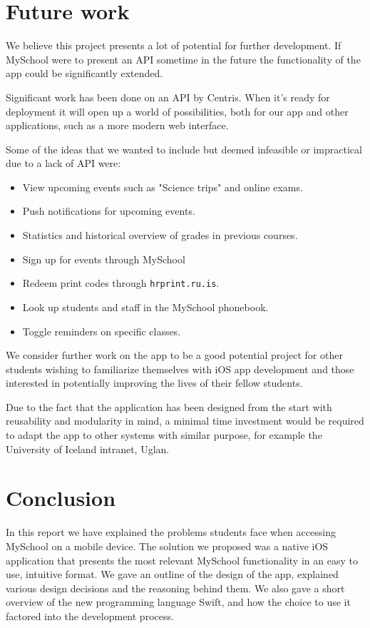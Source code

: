 \documentclass[pdftex, DIV=calc, paper=a4, fontsize=11pt]{scrartcl}	 %
\begin{document}
\section{Future work}
\label{sec:future}

We believe this project presents a lot of potential for further development. If MySchool were to
present an API sometime in the future the functionality of the app could be significantly extended.

Significant work has been done on an API by Centris\cite{centris}. When it's ready for deployment it will open
up a world of possibilities, both for our app and other applications, such as a more modern web 
interface.

Some of the ideas that we wanted to include but deemed infeasible or impractical due to a lack
of API were:

\begin{itemize}
    \item View upcoming events such as "Science trips" and online exams.
    \item Push notifications for upcoming events.
    \item Statistics and historical overview of grades in previous courses.
    \item Sign up for events through MySchool
    \item Redeem print codes through \texttt{hrprint.ru.is}.
    \item Look up students and staff in the MySchool phonebook.
    \item Toggle reminders on specific classes.
\end{itemize}

We consider further work on the app to be a good potential project for other students wishing to 
familiarize themselves with iOS app development and those interested in potentially improving the
lives of their fellow students. 

Due to the fact that the application has been designed from the start with reusability and modularity
in mind, a minimal time investment would be required to adapt the app to other systems with similar
purpose, for example the University of Iceland intranet, Uglan\cite{uglan}.

\section{Conclusion}

In this report we have explained the problems students face when accessing MySchool on a mobile 
device. The solution we proposed was a native iOS application that presents the most relevant 
MySchool functionality in an easy to use, intuitive format. We gave an outline of the design of the
app, explained various design decisions and the reasoning behind them. We also gave a short overview
of the new programming language Swift, and how the choice to use it factored into the development 
process.
\end{document}
